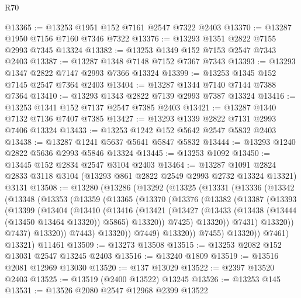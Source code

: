 \begin{lexlean}{R70}
\begin{coremodule}
@13365 := @13253 @1951 @152 @7161 @2547 @7322 @2403
@13370 := @13287 @1950 @7156 @7160 @7346 @7322
@13376 := @13293 @1351 @2822 @7155 @2993 @7345 @13324
@13382 := @13253 @1349 @152 @7153 @2547 @7343 @2403
@13387 := @13287 @1348 @7148 @7152 @7367 @7343
@13393 := @13293 @1347 @2822 @7147 @2993 @7366 @13324
@13399 := @13253 @1345 @152 @7145 @2547 @7364 @2403
@13404 := @13287 @1344 @7140 @7144 @7388 @7364
@13410 := @13293 @1343 @2822 @7139 @2993 @7387 @13324
@13416 := @13253 @1341 @152 @7137 @2547 @7385 @2403
@13421 := @13287 @1340 @7132 @7136 @7407 @7385
@13427 := @13293 @1339 @2822 @7131 @2993 @7406 @13324
@13433 := @13253 @1242 @152 @5642 @2547 @5832 @2403
@13438 := @13287 @1241 @5637 @5641 @5847 @5832
@13444 := @13293 @1240 @2822 @5636 @2993 @5846 @13324
@13445 := @13253 @1092
@13450 := @13445 @152 @2834 @2547 @3104 @2403
@13464 := @13287
    @1091
    @2824
    @2833
    @3118
    @3104
    (@13293 @861 @2822 @2549 @2993 @2732 @13324 @13321)
    @3131
@13508 := @13280
    (@13286
      (@13292
        (@13325
          (@13331
            (@13336
              (@13342
                (@13348
                  (@13353
                    (@13359
                      (@13365
                        (@13370
                          (@13376
                            (@13382
                              (@13387
                                (@13393
                                  (@13399
                                    (@13404
                                      (@13410
                                        (@13416
                                          (@13421
                                            (@13427
                                              (@13433
                                                (@13438 (@13444 (@13450 @13464 @13320)) @5865)
                                                @13320))
                                            @7425)
                                          @13320))
                                      @7431)
                                    @13320))
                                @7437)
                              @13320))
                          @7443)
                        @13320))
                    @7449)
                  @13320))
              @7455)
            @13320))
        @7461)
      @13321)
    @11461
@13509 := @13273 @13508
@13515 := @13253 @2082 @152 @13031 @2547 @13245 @2403
@13516 := @13240 @1809
@13519 := @13516 @2081 @12969 @13030
@13520 := @137 @13029
@13522 := @2397 @13520 @2403
@13525 := @13519 (@2400 @13522) @13245
@13526 := @13253 @145
@13531 := @13526 @2080 @2547 @12968 @2399 @13522

\end{coremodule}
\end{lexlean}
